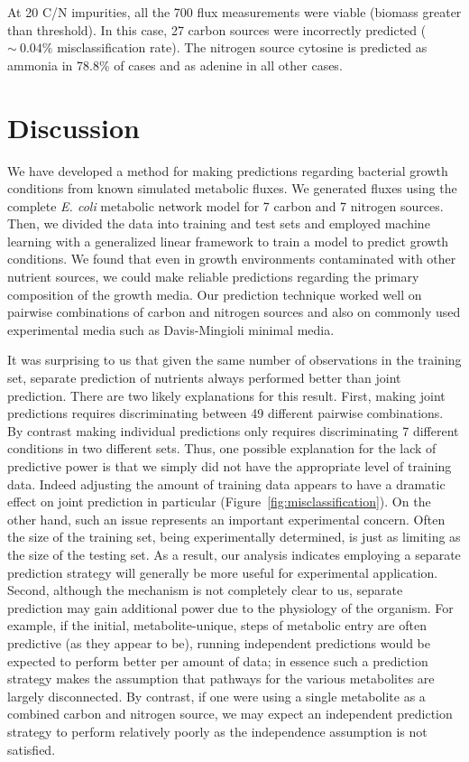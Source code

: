 \documentclass[12pt]{article}
\begin{document}
At 20 C/N impurities, all the 700 flux measurements were viable (biomass greater than threshold). In this case, 27 carbon sources were incorrectly predicted ($\sim~0.04\%$ misclassification rate). The nitrogen source cytosine is predicted as ammonia in 78.8\% of cases and as adenine in all other cases.

\section{Discussion}

We have developed a method for making predictions regarding bacterial growth conditions from known simulated metabolic fluxes. We generated fluxes using the complete \emph{E. coli} metabolic network model for 7 carbon and 7 nitrogen sources. Then, we divided the data into training and test sets and employed machine learning with a generalized linear framework to train a model to predict growth conditions. We found that even in growth environments contaminated with other nutrient sources, we could make reliable predictions regarding the primary composition of the growth media.
Our prediction technique worked well on pairwise combinations of carbon and nitrogen sources and also on commonly used experimental media such as Davis-Mingioli minimal media.

It was surprising to us that given the same number of observations in the training set, separate prediction of nutrients always performed better than joint prediction. There are two likely explanations for this result. First, making joint predictions requires discriminating between 49 different pairwise combinations. By contrast making individual predictions only requires discriminating 7 different conditions in two different sets. Thus, one possible explanation for the lack of predictive power is that we simply did not have the appropriate level of training data. Indeed adjusting the amount of training data appears to have a dramatic effect on joint prediction in particular (Figure~\ref{fig:misclassification}). On the other hand, such an issue represents an important experimental concern. Often the size of the training set, being experimentally determined, is just as limiting as the size of the testing set. As a result, our analysis indicates employing a separate prediction strategy will generally be more useful for experimental application. Second, although the mechanism is not completely clear to us, separate prediction may gain additional power due to the physiology of the organism. For example, if the initial, metabolite-unique, steps of metabolic entry are often predictive (as they appear to be), running independent predictions would be expected to perform better per amount of data; in essence such a prediction strategy makes the assumption that pathways for the various metabolites are largely disconnected. By contrast, if one were using a single metabolite as a combined carbon and nitrogen source, we may expect an independent prediction strategy to perform relatively poorly as the independence assumption is not satisfied.
\end{document}
